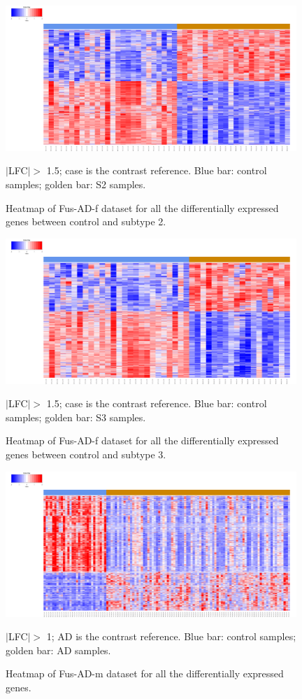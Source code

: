 \begin{figure}[!ht]
    \centerline{\includegraphics[width = 11cm]{Figures/DE heatmap/CTLvs2_AD-FUS-f_all.png}}
\caption{Heatmap of Fus-AD-f dataset for all the differentially expressed genes between control and subtype 2.}
\footnotesize $|$LFC$| >$ 1.5; case is the contrast reference. Blue bar: control samples; golden bar: S2 samples.
\end{figure}

\begin{figure}[!ht]
    \centerline{\includegraphics[width = 11cm]{Figures/DE heatmap/CTLvs3_AD-FUS-f_all.png}}
\caption{Heatmap of Fus-AD-f dataset for all the differentially expressed genes between control and subtype 3.}
\footnotesize $|$LFC$| >$ 1.5; case is the contrast reference. Blue bar: control samples; golden bar: S3 samples.
\end{figure}


\begin{figure}[!ht]
    \centerline{\includegraphics[width = 11cm]{Figures/DE heatmap/CTLvsAD-FUS-m_all.png}}
\caption{Heatmap of Fus-AD-m dataset for all the differentially expressed genes.}
\label{DE-fus-ad-m}
\footnotesize $|$LFC$| >$ 1; AD is the contrast reference. Blue bar: control samples; golden bar: AD samples.
\end{figure}

